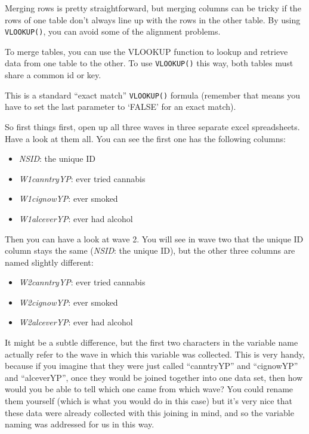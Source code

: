 \documentclass[]{book}
\providecommand{\tightlist}{%
  \setlength{\itemsep}{0pt}\setlength{\parskip}{0pt}}
\theoremstyle{definition}
\theoremstyle{definition}
\theoremstyle{definition}
\theoremstyle{remark}
\begin{document}
Merging rows is pretty straightforward, but merging columns can be
tricky if the rows of one table don't always line up with the rows in
the other table. By using \texttt{VLOOKUP()}, you can avoid some of the
alignment problems.

To merge tables, you can use the VLOOKUP function to lookup and retrieve
data from one table to the other. To use \texttt{VLOOKUP()} this way,
both tables must share a common id or key.

This is a standard ``exact match'' \texttt{VLOOKUP()} formula (remember
that means you have to set the last parameter to `FALSE' for an exact
match).

So first things first, open up all three waves in three separate excel
spreadsheets. Have a look at them all. You can see the first one has the
following columns:

\begin{itemize}
\tightlist
\item
  \emph{NSID}: the unique ID
\item
  \emph{W1canntryYP}: ever tried cannabis\\
\item
  \emph{W1cignowYP}: ever smoked
\item
  \emph{W1alceverYP}: ever had alcohol
\end{itemize}

Then you can have a look at wave 2. You will see in wave two that the
unique ID column stays the same (\emph{NSID}: the unique ID), but the
other three columns are named slightly different:

\begin{itemize}
\tightlist
\item
  \emph{W2canntryYP}: ever tried cannabis\\
\item
  \emph{W2cignowYP}: ever smoked
\item
  \emph{W2alceverYP}: ever had alcohol
\end{itemize}

It might be a subtle difference, but the first two characters in the
variable name actually refer to the wave in which this variable was
collected. This is very handy, because if you imagine that they were
just called ``canntryYP'' and ``cignowYP'' and ``alceverYP'', once they
would be joined together into one data set, then how would you be able
to tell which one came from which wave? You could rename them yourself
(which is what you would do in this case) but it's very nice that these
data were already collected with this joining in mind, and so the
variable naming was addressed for us in this way.
\end{document}
